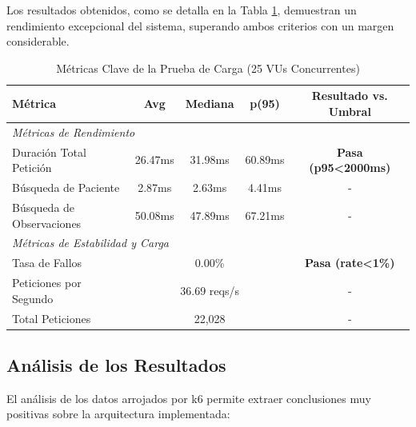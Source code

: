 Los resultados obtenidos, como se detalla en la Tabla \ref{tab:k6_results}, demuestran un rendimiento excepcional del sistema, superando ambos criterios con un margen considerable.

\begin{table}[H]
    \centering
    \caption{Métricas Clave de la Prueba de Carga (25 VUs Concurrentes)}
    \label{tab:k6_results}
    \begin{tabular}{lcccc}
        \toprule
        \textbf{Métrica} & \textbf{Avg} & \textbf{Mediana} & \textbf{p(95)} & \textbf{Resultado vs. Umbral} \\
        \midrule
        \multicolumn{5}{l}{\textit{Métricas de Rendimiento}} \\
        Duración Total Petición & 26.47ms & 31.98ms & 60.89ms & \textcolor{green!60!black}{\textbf{Pasa (p95<2000ms)}} \\
        Búsqueda de Paciente & 2.87ms & 2.63ms & 4.41ms & - \\
        Búsqueda de Observaciones & 50.08ms & 47.89ms & 67.21ms & - \\
        \midrule
        \multicolumn{5}{l}{\textit{Métricas de Estabilidad y Carga}} \\
        Tasa de Fallos & \multicolumn{3}{c}{0.00\%} & \textcolor{green!60!black}{\textbf{Pasa (rate<1\%)}} \\
        Peticiones por Segundo & \multicolumn{3}{c}{36.69 reqs/s} & - \\
        Total Peticiones & \multicolumn{3}{c}{22,028} & - \\
        \bottomrule
    \end{tabular}
\end{table}

\subsection{Análisis de los Resultados}
\label{sec:analisis_resultados_carga}

El análisis de los datos arrojados por k6 permite extraer conclusiones muy positivas sobre la arquitectura implementada:

